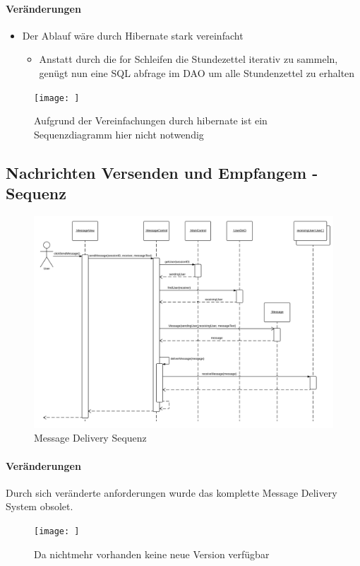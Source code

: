         \paragraph{Veränderungen}
        \begin{itemize}
            \item Der Ablauf wäre durch Hibernate stark vereinfacht
            \begin{itemize}
                \item Anstatt durch die for Schleifen die Stundezettel iterativ zu sammeln, genügt nun eine SQL abfrage im DAO um alle Stundenzettel zu erhalten
            \end{itemize}
        \end{itemize}

        \begin{figure}
          \centering
            \texttt{[image: ]}
           \caption{Aufgrund der Vereinfachungen durch hibernate ist ein Sequenzdiagramm hier nicht notwendig}
        \end{figure}

        \subsection{Nachrichten Versenden und Empfangem - Sequenz}

            \begin{figure}
              \centering
                \includegraphics[width=\linewidth]{Message-Delivery.svg}
               \caption{Message Delivery Sequenz}
            \end{figure}

            \paragraph{Veränderungen}
                Durch sich veränderte anforderungen wurde das komplette Message Delivery System obsolet.
            \begin{figure}
              \centering
                \texttt{[image: ]}
               \caption{Da nichtmehr vorhanden keine neue Version verfügbar}
            \end{figure}


